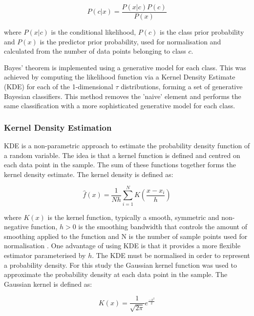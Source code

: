\begin{equation} \label{naive-bayes}
    P(c|x) = \frac{P(x|c)P(c)}{P(x)}
\end{equation}

where $P(x|c)$ is the conditional likelihood, $P(c)$ is the class prior probability and $P(x)$ is the predictor prior probability, used for normalisation and calculated from the number of data points belonging to class $c$.

Bayes' theorem is implemented using a generative model for each class. This was achieved by computing the likelihood function via a Kernel Density Estimate (KDE) for each of the 1-dimensional $\tau$ distributions, forming a set of generative Bayesian classifiers. This method removes the 'naive' element and performs the same classification with a more sophisticated generative model for each class.

\subsubsection{Kernel Density Estimation}

KDE is a non-parametric approach to estimate the probability density function of a random variable. The idea is that a kernel function is defined and centred on each data point in the sample. The sum of these functions together forms the kernel density estimate. The kernel density is defined as:
    
\begin{equation} \label{eq2}
    \hat{f}(x) = \frac{1}{Nh}  \sum_{i=1}^{N} K \left( \frac{x - x_i}{h} \right)
\end{equation}

where $K(x)$ is the kernel function, typically a smooth, symmetric and non-negative function, $h > 0$ is the smoothing bandwidth that controls the amount of smoothing applied to the function and N is the number of sample points used for normalisation \cite{kde}. One advantage of using KDE is that it provides a more flexible estimator parameterised by $h$. The KDE must be normalised in order to represent a probability density. For this study the Gaussian kernel function was used to approximate the probability density at each data point in the sample. The Gaussian kernel is defined as:
    
\begin{equation} \label{eq3}
    K(x) = \frac{1}{\sqrt{2\pi}} e^{\frac{-x^2}{2}}
\end{equation}

